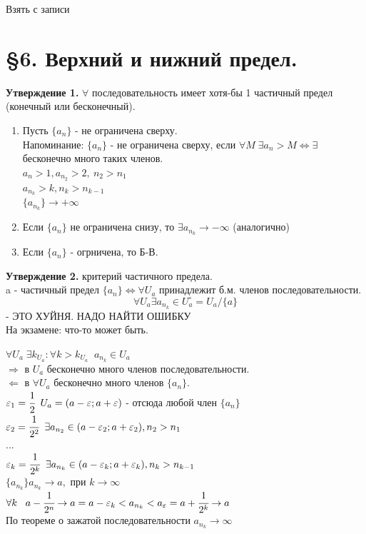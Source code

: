 \documentclass[12pt, a4paper]{article}
\newcommand{\eps}{\varepsilon}
\begin{document}
\begin{tcolorbox}[title=Доказательство]
    Взять с записи
\end{tcolorbox}

\section{\S 6. Верхний и нижний предел.}
\textbf{Утверждение 1.} $\forall$ последовательность имеет хотя-бы 1 частичный предел (конечный или бесконечный).
\begin{tcolorbox}[title=Доказательство]
    \begin{enumerate}
        \item Пусть $\{a_n\}$ - не ограничена сверху.\\
        Напоминание: $\{ a_n \}$ - не ограничена сверху, если $\forall M\; \exists a_n > M \Leftrightarrow \exists$ бесконечно много таких членов.\\
        $a_n > 1, a_{n_2} > 2,\ n_2>n_1$\\
        $a_{n_k} > k, n_k > n_{k-1}$\\
        $\{a_{n_k}\} \to +\infty$
        \item Если $\{a_n\}$ не ограничена снизу, то $\exists a_{n_k}\to -\infty$ (аналогично)
        \item Если $\{a_n\}$ - огрничена, то Б-В.
        
    \end{enumerate}
\end{tcolorbox}

\textbf{Утверждение 2.} критерий частичного предела.\\
a - частичный предел $\{a_n\} \Leftrightarrow \forall U_a$ принадлежит б.м. членов последовательности.
\[ \forall U_a \exists a_{n_k}\in U_a^\circ = U_a /\{a\} \] - ЭТО ХУЙНЯ. НАДО НАЙТИ ОШИБКУ\\
На экзамене: что-то может быть.\\

\begin{tcolorbox}[]
    $\forall U_a \; \exists k_{U_a}: \forall k > k_{U_a} \;\; a_{n_k} \in U_a$\\
    $\Rightarrow$ в $U_a$ бесконечно много членов последовательности.\\
    $\Leftarrow$ в $\forall U_a$ бесконечно много членов $\{a_n\}$.\\
    $\eps_1 = \cfrac{1}{2} \;\; U_a = (a-\eps; a+\eps)$ - отсюда любой член $\{a_n\}$\\
    $\eps_2 = \cfrac{1}{2^2} \;\; \exists a_{n_2} \in (a-\eps_2; a+\eps_2), n_2>n_1$\\
    ...\\
    $\eps_k = \cfrac{1}{2^k} \;\; \exists a_{n_k} \in (a-\eps_k; a+\eps_k), n_k>n_{k-1}$\\
    $\{a_{n_k}\} a_{n_k} \to a,$ при $k\to \infty$\\
    $\forall k\;\;\; a-\cfrac{1}{2^n} \to a= a - \eps_k < a_{n_k} < a_\eps = a+ \cfrac{1}{2^k} \to a$\\
    По теореме о зажатой последовательности $a_{n_k} \to \infty$
\end{tcolorbox}
\end{document}
